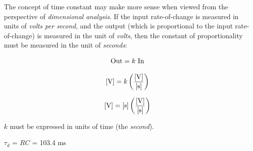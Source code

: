 \vskip 10pt

The concept of time constant may make more sense when viewed from the perspective of {\it dimensional analysis}.  If the input rate-of-change is measured in units of {\it volts per second}, and the output (which is proportional to the input rate-of-change) is measured in the unit of {\it volts}, then the constant of proportionality must be measured in the unit of {\it seconds}:

$$\hbox{Out} = k \hbox{ In}$$

$$\hbox{[V]} = k \left({\hbox{[V]} \over \hbox{[s]}}\right)$$

$$\hbox{[V]} = \hbox{[s]} \left({\hbox{[V]} \over \hbox{[s]}}\right)$$

$k$ must be expressed in units of time (the {\it second}).

\vskip 10pt

$\tau_d$ = $RC$ = 103.4 ms











